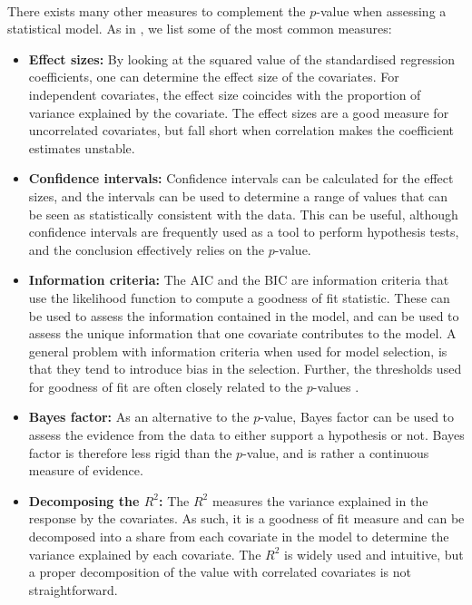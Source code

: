 \\
There exists many other measures to complement the $p$-value when assessing a statistical model. As in \citet{Arnstad:Relative_variable_importance_in_Bayesian_linear_mixed_models:2024}, we list some of the most common measures:
\begin{itemize}
    \item \textbf{Effect sizes:} By looking at the squared value of the standardised regression coefficients, one can determine the effect size of the covariates. For independent covariates, the effect size coincides with the proportion of variance explained by the covariate. The effect sizes are a good measure for uncorrelated covariates, but fall short when correlation makes the coefficient estimates unstable.
    \item \textbf{Confidence intervals:} Confidence intervals can be calculated for the effect sizes, and the intervals can be used to determine a range of values that can be seen as statistically consistent with the data. This can be useful, although confidence intervals are frequently used as a tool to perform hypothesis tests, and the conclusion effectively relies on the $p$-value.
    \item \textbf{Information criteria:} The AIC \citep{Akaike_AIC} and the BIC \citep{Schwarz_BIC} are information criteria that use the likelihood function to compute a goodness of fit statistic. These can be used to assess the information contained in the model, and can be used to assess the unique information that one covariate contributes to the model. A general problem with information criteria when used for model selection, is that they tend to introduce bias in the selection. Further, the thresholds used for goodness of fit are often closely related to the $p$-values \citep{Murtaugh2014}. 
    \item \textbf{Bayes factor:} As an alternative to the $p$-value, Bayes factor can be used to assess the evidence from the data to either support a hypothesis or not. Bayes factor is therefore less rigid than the $p$-value, and is rather a continuous measure of evidence.
    \item \textbf{Decomposing the $R^2$:} The $R^2$ measures the variance explained in the response by the covariates. As such, it is a goodness of fit measure and can be decomposed into a share from each covariate in the model to determine the variance explained by each covariate. The $R^2$ is widely used and intuitive, but a proper decomposition of the value with correlated covariates is not straightforward.
\end{itemize}
